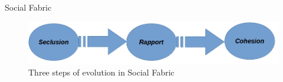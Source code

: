 \documentclass[table]{beamer}
\begin{document}
	\begin{frame}{Social Fabric}
				\begin{figure}[v]
					\includegraphics[scale=0.47]{3steps}
					\centering
					\caption{Three steps of evolution in Social Fabric}
					\label{ref:steps}
				\end{figure}
	\end{frame}
	
\end{document}
